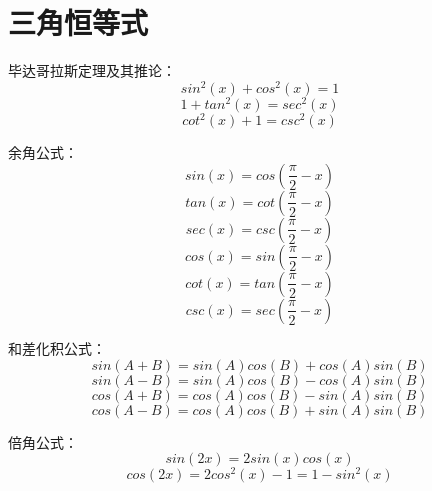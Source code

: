 \documentclass[11pt, b5paper, oneside]{book}
\begin{document}
\section{三角恒等式}

毕达哥拉斯定理及其推论：
\begin{equation}
    sin^2(x)+cos^2(x)=1
\end{equation}
\begin{equation}
    1+tan^2(x)=sec^2(x)
\end{equation}
\begin{equation}
    cot^2(x)+1=csc^2(x)
\end{equation}

余角公式：
\begin{equation}
    sin(x)=cos(\frac{\pi}{2}-x)
\end{equation}
\begin{equation}
    tan(x)=cot(\frac{\pi}{2}-x)
\end{equation}
\begin{equation}
    sec(x)=csc(\frac{\pi}{2}-x)
\end{equation}
\begin{equation}
    cos(x)=sin(\frac{\pi}{2}-x)
\end{equation}
\begin{equation}
    cot(x)=tan(\frac{\pi}{2}-x)
\end{equation}
\begin{equation}
    csc(x)=sec(\frac{\pi}{2}-x)
\end{equation}

和差化积公式：
\begin{equation}
    sin(A+B)=sin(A)cos(B)+cos(A)sin(B)
\end{equation}
\begin{equation}
    sin(A-B)=sin(A)cos(B)-cos(A)sin(B)
\end{equation}
\begin{equation}
    cos(A+B)=cos(A)cos(B)-sin(A)sin(B)
\end{equation}
\begin{equation}
    cos(A-B)=cos(A)cos(B)+sin(A)sin(B)
\end{equation}

倍角公式：
\begin{equation}
    sin(2x)=2sin(x)cos(x)
\end{equation}
\begin{equation}
    cos(2x)=2cos^2(x)-1=1-sin^2(x)
\end{equation}
\end{document}
